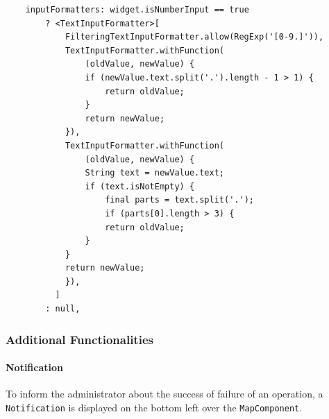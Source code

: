 \lstset{style=mycsharp, caption=InputFormatter in Inputfield}
\begin{lstlisting}
    inputFormatters: widget.isNumberInput == true
        ? <TextInputFormatter>[
            FilteringTextInputFormatter.allow(RegExp('[0-9.]')),
            TextInputFormatter.withFunction(
                (oldValue, newValue) {
                if (newValue.text.split('.').length - 1 > 1) {
                    return oldValue;
                }
                return newValue;
            }),
            TextInputFormatter.withFunction(
                (oldValue, newValue) {
                String text = newValue.text;
                if (text.isNotEmpty) {
                    final parts = text.split('.');
                    if (parts[0].length > 3) {
                    return oldValue;
                }
            }
            return newValue;
            }),
          ]
        : null,
\end{lstlisting}



\subsubsection{Additional Functionalities}


\label{fig:Notification}
\paragraph{Notification}
To inform the administrator about the success of failure of an operation, a \texttt{Notification} is displayed on the bottom left over the \texttt{MapComponent}.


